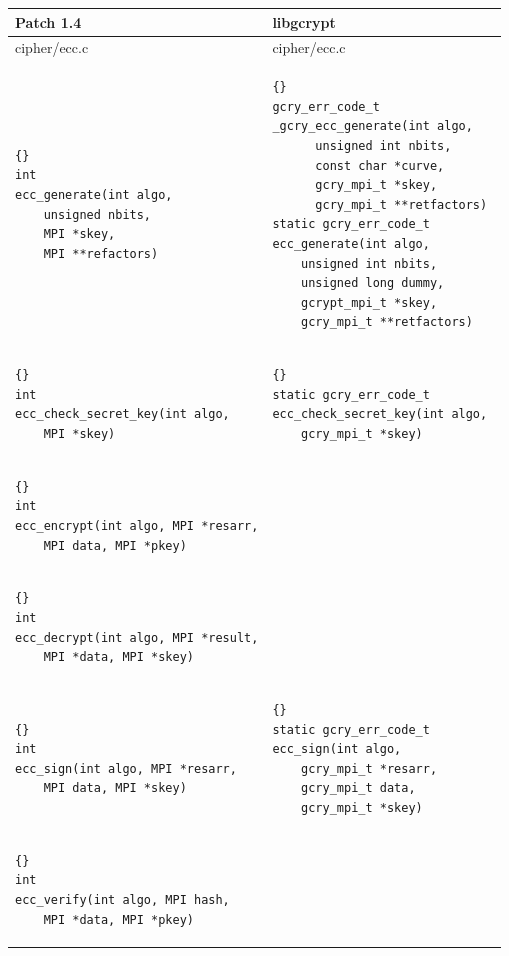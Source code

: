 \documentclass[12pt,twoside,catalan,a4paper]{book}%
\numberwithin{figure}{section}		%
\theoremstyle{definition}   			%
\theoremstyle{saltolinea}   			%
\begin{document}
\begin{table}
\begin{center}
\begin{tabular}{|l|l|}
\hline
Patch 1.4 & libgcrypt \\
\hline
 {\sf cipher/ecc.c}     & {\sf cipher/ecc.c} \\
\hline
{\tt \begin{lstlisting}{}
int
ecc_generate(int algo,
    unsigned nbits,
    MPI *skey,
    MPI **refactors)
\end{lstlisting} }
&
{\tt \begin{lstlisting}{}
gcry_err_code_t
_gcry_ecc_generate(int algo,
      unsigned int nbits,
      const char *curve,
      gcry_mpi_t *skey,
      gcry_mpi_t **retfactors)
static gcry_err_code_t
ecc_generate(int algo,
    unsigned int nbits,
    unsigned long dummy,
    gcrypt_mpi_t *skey,
    gcry_mpi_t **retfactors)
\end{lstlisting} }
\\
\hline
{\tt \begin{lstlisting}{}
int
ecc_check_secret_key(int algo,
    MPI *skey)
\end{lstlisting} }
&
{\tt \begin{lstlisting}{}
static gcry_err_code_t
ecc_check_secret_key(int algo, 
    gcry_mpi_t *skey)
\end{lstlisting} }
\\
\hline
{\tt \begin{lstlisting}{}
int
ecc_encrypt(int algo, MPI *resarr,
    MPI data, MPI *pkey)
\end{lstlisting}}
&\\
\hline
{\tt \begin{lstlisting}{}
int
ecc_decrypt(int algo, MPI *result,
    MPI *data, MPI *skey)
\end{lstlisting} }
&\\
\hline
{\tt \begin{lstlisting}{}
int
ecc_sign(int algo, MPI *resarr,
    MPI data, MPI *skey)
\end{lstlisting} }
&
{\tt \begin{lstlisting}{}
static gcry_err_code_t
ecc_sign(int algo,
    gcry_mpi_t *resarr,
    gcry_mpi_t data,
    gcry_mpi_t *skey)
\end{lstlisting} }
\\
\hline
{\tt \begin{lstlisting}{}
int
ecc_verify(int algo, MPI hash,
    MPI *data, MPI *pkey)
\end{lstlisting} }

\end{tabular}
\end{center}
\end{table}
\end{document}
